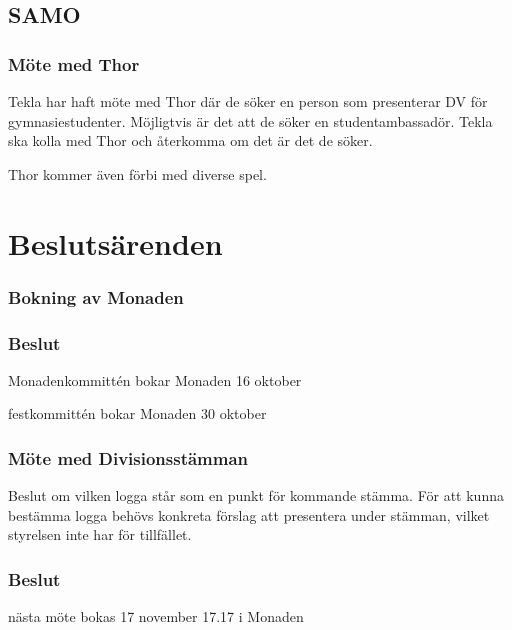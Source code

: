 \documentclass[protokoll]{dvd}
\begin{document}
\subsection{SAMO}

\subsubsection{Möte med Thor}
Tekla har haft möte med Thor där de söker en person som presenterar DV för gymnasiestudenter.
Möjligtvis är det att de söker en studentambassadör. Tekla ska kolla med Thor och återkomma om det är det de söker.

Thor kommer även förbi med diverse spel.

\newpage


\section{Beslutsärenden}

\subsubsection{Bokning av Monaden}

\subsubsection*{Beslut}
\begin{attsatser}
    \item Monadenkommittén bokar Monaden 16 oktober
    \item festkommittén bokar Monaden 30 oktober
\end{attsatser}

\subsubsection{Möte med Divisionsstämman}

Beslut om vilken logga står som en punkt för kommande stämma. 
För att kunna bestämma logga behövs konkreta förslag att presentera under stämman, vilket styrelsen inte har för tillfället.

\subsubsection*{Beslut}
\begin{attsatser}
    \item nästa möte bokas 17 november 17.17 i Monaden 
\end{attsatser}
\end{document}
